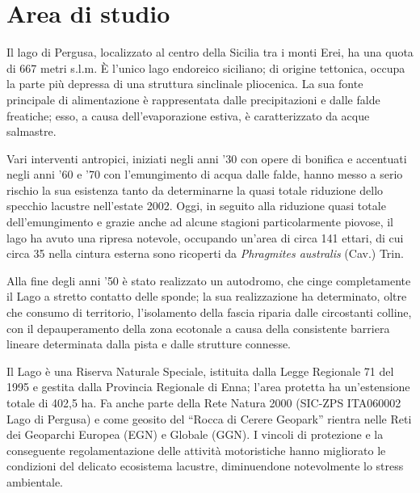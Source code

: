\section*{Area di studio}

Il lago di Pergusa, localizzato al centro della Sicilia tra i monti
Erei, ha una quota di 667 metri s.l.m. \`E l{\textquoteright}unico lago
endoreico siciliano;{ di origine tettonica, occupa la
parte pi\`u depressa di una struttura sinclinale pliocenica. La sua
fonte principale di alimentazione \`e rappresentata dalle
precipitazioni e dalle falde freatiche; esso, a causa
dell{\textquoteright}evaporazione estiva, \`e caratterizzato da acque
salmastre.}

{Vari interventi antropici, iniziati negli anni
{\textquoteright}30 con opere di bonifica e accentuati negli anni
{\textquoteright}60 e {\textquoteright}70 con
l{\textquoteright}emungimento di acqua dalle falde, hanno messo a serio
rischio la sua esistenza tanto da determinarne la quasi totale
riduzione dello specchio lacustre nell{\textquoteright}estate 2002.
Oggi, in seguito alla riduzione quasi totale
dell{\textquoteright}emungimento e grazie anche ad alcune stagioni
particolarmente piovose, il lago ha avuto una ripresa notevole,
occupando un{\textquoteright}area} di circa 141 ettari, di cui circa 35
nella cintura esterna sono ricoperti da \textit{Phragmites australis
}(Cav.) Trin.

{
Alla fine degli anni {\textquoteright}50 \`e stato realizzato un
autodromo, che cinge completamente il Lago a stretto contatto delle
sponde; la sua realizzazione ha determinato, oltre che consumo di
territorio, l{\textquoteright}isolamento della fascia riparia dalle
circostanti colline, con il depauperamento della zona ecotonale a causa
della consistente barriera lineare determinata dalla pista e dalle
strutture connesse.}

Il Lago \`e una Riserva Naturale Speciale, istituita dalla Legge
Regionale 71 del 1995 e gestita dalla Provincia Regionale di Enna;
{l{\textquoteright}area protetta ha
un{\textquoteright}estensione totale di 402,5 ha.} Fa anche parte della
Rete Natura 2000 (SIC-ZPS ITA060002 {\textquotedbl}Lago di
Pergusa{\textquotedbl}) e c{ome geosito del
{\textquotedblleft}Rocca di Cerere Geopark{\textquotedblright} rientra
nelle Reti dei Geoparchi Europea (EGN) e Globale (GGN).}
{I vincoli di protezione e la conseguente
regolamentazione delle attivit\`a motoristiche hanno migliorato le
condizioni del delicato ecosistema lacustre, diminuendone notevolmente
lo stress ambientale.}

